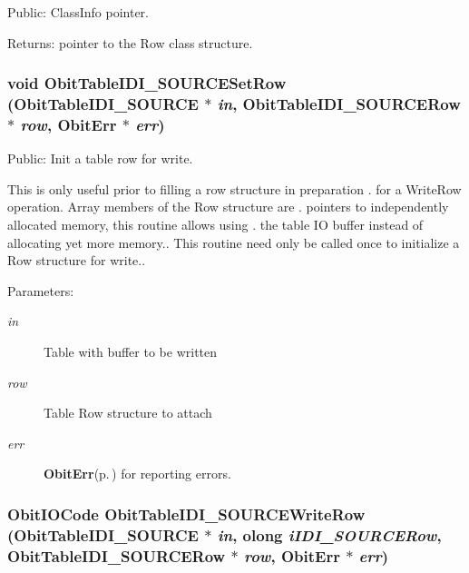 Public: Class\-Info pointer. 

\begin{Desc}
\item[Returns:]pointer to the Row class structure. \end{Desc}
\subsubsection{\setlength{\rightskip}{0pt plus 5cm}void Obit\-Table\-IDI\_\-SOURCESet\-Row ({\bf Obit\-Table\-IDI\_\-SOURCE} $\ast$ {\em in}, {\bf Obit\-Table\-IDI\_\-SOURCERow} $\ast$ {\em row}, {\bf Obit\-Err} $\ast$ {\em err})}\label{ObitTableIDI__SOURCE_8h_a19}


Public: Init a table row for write. 

This is only useful prior to filling a row structure in preparation . for a Write\-Row operation. Array members of the Row structure are . pointers to independently allocated memory, this routine allows using . the table IO buffer instead of allocating yet more memory.. This routine need only be called once to initialize a Row structure for write.. \begin{Desc}
\item[Parameters:]
\begin{description}
\item[{\em in}]Table with buffer to be written \item[{\em row}]Table Row structure to attach \item[{\em err}]{\bf Obit\-Err}{\rm (p.\,\pageref{structObitErr})} for reporting errors. \end{description}
\end{Desc}
\subsubsection{\setlength{\rightskip}{0pt plus 5cm}Obit\-IOCode Obit\-Table\-IDI\_\-SOURCEWrite\-Row ({\bf Obit\-Table\-IDI\_\-SOURCE} $\ast$ {\em in}, {\bf olong} {\em i\-IDI\_\-SOURCERow}, {\bf Obit\-Table\-IDI\_\-SOURCERow} $\ast$ {\em row}, {\bf Obit\-Err} $\ast$ {\em err})}\label{ObitTableIDI__SOURCE_8h_a20}


